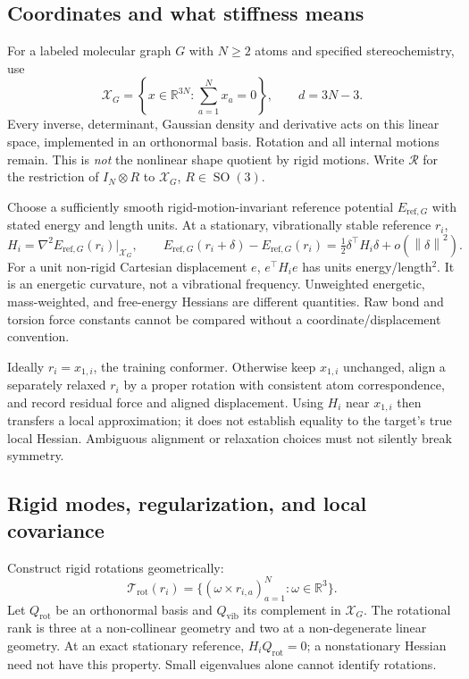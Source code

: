 \documentclass[11pt,letterpaper]{article}
\newcommand{\R}{\mathbb R}
\newcommand{\X}{\mathcal X_G}
\newcommand{\SO}{\operatorname{SO}(3)}
\newcommand{\norm}[1]{\left\lVert#1\right\rVert}
\begin{document}
\subsection{Coordinates and what stiffness means}
For a labeled molecular graph $G$ with $N\geq2$ atoms and specified stereochemistry, use
\begin{equation}
\X=\left\{x\in\R^{3N}:\sum_{a=1}^N x_a=0\right\},\qquad d=3N-3.
\label{eq:space}
\end{equation}
Every inverse, determinant, Gaussian density and derivative acts on this linear space, implemented in an orthonormal basis. Rotation and all internal motions remain. This is \emph{not} the nonlinear shape quotient by rigid motions. Write $\mathcal R$ for the restriction of $I_N\otimes R$ to $\X$, $R\in\SO$.

Choose a sufficiently smooth rigid-motion-invariant reference potential $E_{\mathrm{ref},G}$ with stated energy and length units. At a stationary, vibrationally stable reference $r_i$,
\begin{equation}
H_i=\nabla^2E_{\mathrm{ref},G}(r_i)\big|_{\X},\qquad
E_{\mathrm{ref},G}(r_i+\delta)-E_{\mathrm{ref},G}(r_i)
=\tfrac12\delta^\top H_i\delta+o(\norm{\delta}^2).
\label{eq:hessian}
\end{equation}
For a unit non-rigid Cartesian displacement $e$, $e^\top H_i e$ has units energy/length$^2$. It is an energetic curvature, not a vibrational frequency. Unweighted energetic, mass-weighted, and free-energy Hessians are different quantities. Raw bond and torsion force constants cannot be compared without a coordinate/displacement convention.

Ideally $r_i=x_{1,i}$, the training conformer. Otherwise keep $x_{1,i}$ unchanged, align a separately relaxed $r_i$ by a proper rotation with consistent atom correspondence, and record residual force and aligned displacement. Using $H_i$ near $x_{1,i}$ then transfers a local approximation; it does not establish equality to the target's true local Hessian. Ambiguous alignment or relaxation choices must not silently break symmetry.

\subsection{Rigid modes, regularization, and local covariance}
Construct rigid rotations geometrically:
\begin{equation}
\mathcal T_{\mathrm{rot}}(r_i)
=\{(\omega\times r_{i,a})_{a=1}^N:\omega\in\R^3\}.
\end{equation}
Let $Q_{\mathrm{rot}}$ be an orthonormal basis and $Q_{\mathrm{vib}}$ its complement in $\X$. The rotational rank is three at a non-collinear geometry and two at a non-degenerate linear geometry. At an exact stationary reference, $H_iQ_{\mathrm{rot}}=0$; a nonstationary Hessian need not have this property. Small eigenvalues alone cannot identify rotations.
\end{document}
